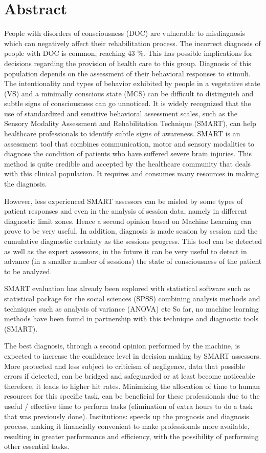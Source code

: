\chapter*{Abstract}

People with disorders of consciousness (DOC) are vulnerable to misdiagnosis which can negatively affect their rehabilitation process. The incorrect diagnosis of people with DOC is common, reaching 43 \%. This has possible implications for decisions regarding the provision of health care to this group. Diagnosis of this population depends on the assessment of their behavioral responses to stimuli. The intentionality and types of behavior exhibited by people in a vegetative state (VS) and a minimally conscious state (MCS) can be difficult to distinguish and subtle signs of consciousness can go unnoticed.
It is widely recognized that the use of standardized and sensitive behavioral assessment scales, such as the Sensory Modality Assessment and Rehabilitation Technique (SMART), can help healthcare professionals to identify subtle signs of awareness.
SMART is an assessment tool that combines communication, motor and sensory modalities to diagnose the condition of patients who have suffered severe brain injuries. This method is quite credible and accepted by the healthcare community that deals with this clinical population. It requires and consumes many resources in making the diagnosis.

However, less experienced SMART assessors can be misled by some types of patient responses and even in the analysis of session data, namely in different diagnostic limit zones. Hence a second opinion based on Machine Learning can prove to be very useful. In addition, diagnosis is made session by session and the cumulative diagnostic certainty as the sessions progress.
This tool can be detected as well as the expert assessors, in the future it can be very useful to detect in advance (in a smaller number of sessions) the state of consciousness of the patient to be analyzed.

SMART evaluation has already been explored with statistical software such as statistical package for the social sciences (SPSS) combining analysis methods and techniques such as analysis of variance (ANOVA)  etc
So far, no machine learning methods have been found in partnership with this technique and diagnostic tools (SMART).
 
The best diagnosis, through a second opinion performed by the machine, is expected to increase the confidence level in decision making by SMART assessors. More protected and less subject to criticism of negligence, data that possible errors if detected, can be bridged and safeguarded or at least become noticeable therefore, it leads to higher hit rates. Minimizing the allocation of time to human resources for this specific task, can be beneficial for these professionals due to the useful / effective time to perform tasks (elimination of extra hours to do a task that was previously done).
Institutions: speeds up the prognosis and diagnosis process, making it financially convenient to make professionals more available, resulting in greater performance and efficiency, with the possibility of performing other essential tasks.\\

